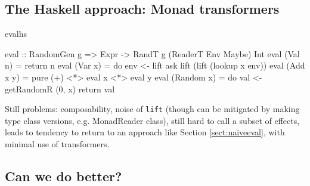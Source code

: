 \subsection{The Haskell approach: Monad transformers}

\begin{SaveVerbatim}{evalhs}

eval :: RandomGen g => 
        Expr -> RandT g (ReaderT Env Maybe) Int
eval (Val n) = return n
eval (Var x) = do env <- lift ask
                  lift (lift (lookup x env))
eval (Add x y) = pure (+) <*> eval x <*> eval y
eval (Random x) = do val <- getRandomR (0, x)
                     return val

\end{SaveVerbatim}

Still problems: composability, noise of \texttt{lift} (though can be mitigated
by making type class versions, e.g. MonadReader class), still hard to call
a subset of effects, leads to tendency to return to an approach like
Section \ref{sect:naiveeval}, with minimal use of transformers.

\subsection{Can we do better?}

